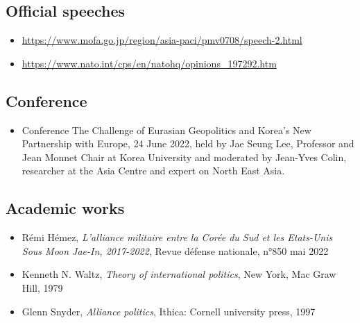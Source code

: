\documentclass[11pt,a4paper]{article}
\begin{document}
\subsection*{Official speeches}
  \begin{itemize}[leftmargin=1.3em,itemsep=.18em,topsep=.25em]
    \item \url{https://www.mofa.go.jp/region/asia-paci/pmv0708/speech-2.html}
    \item \url{https://www.nato.int/cps/en/natohq/opinions_197292.htm}
  \end{itemize}
\subsection*{Conference}
  \begin{itemize}[leftmargin=1.3em,itemsep=.18em,topsep=.25em]
    \item Conference The Challenge of Eurasian Geopolitics and Korea’s New Partnership with Europe, 24 June 2022, held by Jae Seung Lee, Professor and Jean Monnet Chair at Korea University and moderated by Jean-Yves Colin, researcher at the Asia Centre and expert on North East Asia.
  \end{itemize}
\subsection*{Academic works}
  \begin{itemize}[leftmargin=1.3em,itemsep=.18em,topsep=.25em]
    \item Rémi Hémez, \emph{L’alliance militaire entre la Corée du Sud et les Etats-Unis Sous Moon Jae-In, 2017-2022}, Revue défense nationale, n°850 mai 2022
    \item Kenneth N. Waltz, \emph{Theory of international politics}, New York, Mac Graw Hill, 1979
    \item Glenn Snyder, \emph{Alliance politics}, Ithica: Cornell university press, 1997
  \end{itemize}
\end{document}
